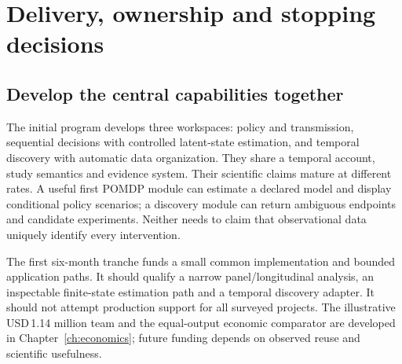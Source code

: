 \chapter{Delivery, ownership and stopping decisions}\label{ch:delivery}
\section{Develop the central capabilities together}
The initial program develops three workspaces: policy and transmission,
sequential decisions with controlled latent-state estimation, and temporal
discovery with automatic data organization. They share a temporal account,
study semantics and evidence system. Their scientific claims mature at
different rates. A useful first POMDP module can estimate a declared model
and display conditional policy scenarios; a discovery module can return
ambiguous endpoints and candidate experiments. Neither needs to claim that
observational data uniquely identify every intervention.

The first six-month tranche funds a small common implementation and
bounded application paths. It should qualify a narrow panel/longitudinal
analysis, an inspectable finite-state estimation path and a temporal
discovery adapter. It should not attempt production support for all
\SoftwareCount{} surveyed projects. The illustrative USD\,1.14 million
team and the equal-output economic comparator are developed in
Chapter~\ref{ch:economics}; future funding depends on observed reuse and
scientific usefulness.

